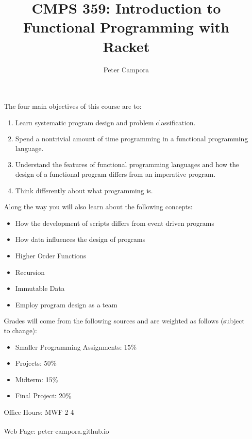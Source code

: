 \documentclass{article}
\begin{document}
\title{CMPS 359: Introduction to Functional Programming with Racket}
\author{Peter Campora}
%
\maketitle 
\noindent The four main objectives of this course are to:
%
\begin{enumerate}
\item Learn systematic program design and problem classification.
\item Spend a nontrivial amount of time programming in a functional programming language.
\item Understand the features of functional programming languages and how the design of a functional
  program differs from an imperative program.
\item Think differently about what programming is.
\end{enumerate}

\noindent Along the way you will also learn about the following concepts:
\begin{itemize}
\item How the development of scripts differs from event driven programs
\item How data influences the design of programs
\item Higher Order Functions
\item Recursion
\item Immutable Data
\item Employ program design as a team
\end{itemize}

\noindent Grades will come from the following sources and are weighted as follows (subject to change):
\begin{itemize}
\item Smaller Programming Assignments: 15\%
\item Projects: 50\%
\item Midterm: 15\%
\item Final Project: 20\%
\end{itemize}

\noindent Office Hours: MWF 2-4\\\\
Web Page: peter-campora.github.io
\end{document}
